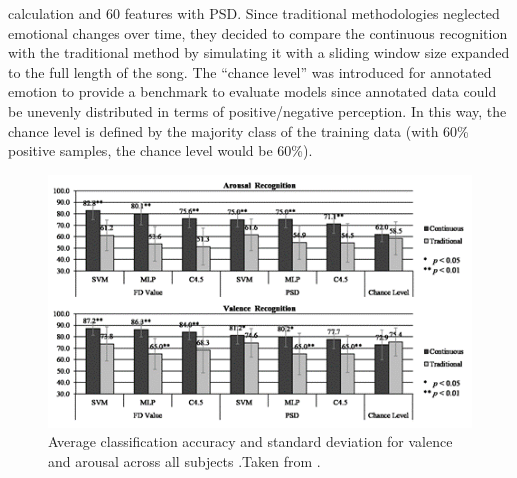 calculation and 60 features with \ac{PSD}. Since traditional methodologies neglected emotional changes over time, they decided to compare the continuous recognition with the traditional method by simulating it with a sliding window size expanded to the full length of the song. The “chance level” was introduced for annotated emotion to provide a benchmark to evaluate models since annotated data could be unevenly distributed in terms of positive/negative perception. In this way, the chance level is defined by the majority class of the training data (with 60\% positive samples, the chance level would be 60\%).

\begin{figure}[h!]
\includegraphics[width=12cm]{img/related_work/thammasan_cont_results.png}
\centering
\caption{Average classification accuracy and standard deviation for valence and arousal across all subjects .Taken from \cite{thammasan_continuous_2016}.}\label{fig_thammasan_cont_results}
\end{figure}

